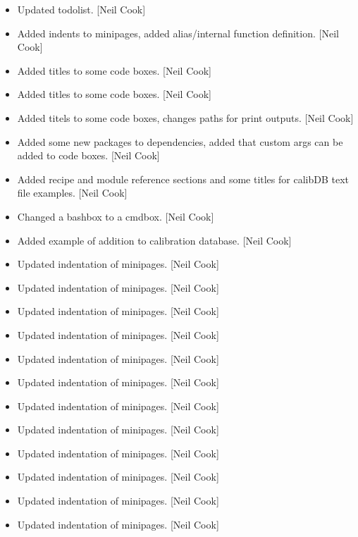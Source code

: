 \documentclass[a4paper,10pt,english]{report}
\begin{document}
\begin{itemize}
\item {} 
Updated todolist. {[}Neil Cook{]}

\item {} 
Added indents to minipages, added alias/internal function definition.
{[}Neil Cook{]}

\item {} 
Added titles to some code boxes. {[}Neil Cook{]}

\item {} 
Added titles to some code boxes. {[}Neil Cook{]}

\item {} 
Added titels to some code boxes, changes paths for print outputs.
{[}Neil Cook{]}

\item {} 
Added some new packages to dependencies, added that custom args can be
added to code boxes. {[}Neil Cook{]}

\item {} 
Added recipe and module reference sections and some titles for calibDB
text file examples. {[}Neil Cook{]}

\item {} 
Changed a bashbox to a cmdbox. {[}Neil Cook{]}

\item {} 
Added example of addition to calibration database. {[}Neil Cook{]}

\item {} 
Updated indentation of minipages. {[}Neil Cook{]}

\item {} 
Updated indentation of minipages. {[}Neil Cook{]}

\item {} 
Updated indentation of minipages. {[}Neil Cook{]}

\item {} 
Updated indentation of minipages. {[}Neil Cook{]}

\item {} 
Updated indentation of minipages. {[}Neil Cook{]}

\item {} 
Updated indentation of minipages. {[}Neil Cook{]}

\item {} 
Updated indentation of minipages. {[}Neil Cook{]}

\item {} 
Updated indentation of minipages. {[}Neil Cook{]}

\item {} 
Updated indentation of minipages. {[}Neil Cook{]}

\item {} 
Updated indentation of minipages. {[}Neil Cook{]}

\item {} 
Updated indentation of minipages. {[}Neil Cook{]}

\item {} 
Updated indentation of minipages. {[}Neil Cook{]}

\end{itemize}
\end{document}
